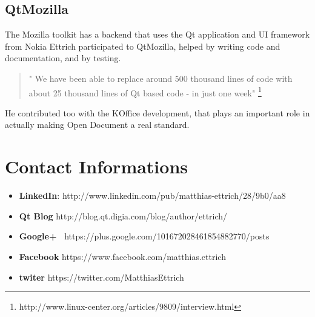 \documentclass[DIV=calc, paper=a4, fontsize=11pt]{scrartcl}
\begin{document}
\subsection{ QtMozilla}
The Mozilla toolkit has a backend that uses the Qt application and UI framework from Nokia
Ettrich participated to QtMozilla, helped by writing code and documentation, and by testing.
\begin {quote}
" We have been able to replace around 500 thousand lines of code with about 25 thousand lines of Qt based code - in just one week" \footnote{http://www.linux-center.org/articles/9809/interview.html}
\end {quote}

He contributed too with the KOffice development, that plays an important role in actually making Open Document a real standard.


\section{Contact Informations }
\begin {itemize}
\item \textbf{LinkedIn}: http://www.linkedin.com/pub/matthias-ettrich/28/9b0/aa8 
\item \textbf{Qt Blog} http://blog.qt.digia.com/blog/author/ettrich/
\item  \textbf{Google+\ } https://plus.google.com/101672028461854882770/posts
\item \textbf{Facebook} https://www.facebook.com/matthias.ettrich
\item \textbf{twiter} https://twitter.com/MatthiasEttrich
\end{itemize}
\end{document}
